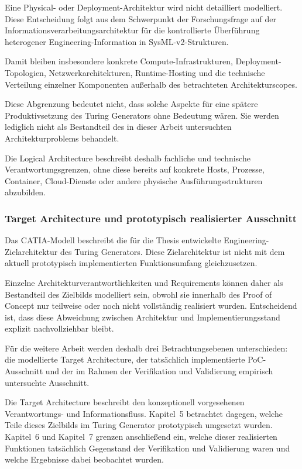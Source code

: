 Eine Physical- oder Deployment-Architektur wird nicht detailliert modelliert.
Diese Entscheidung folgt aus dem Schwerpunkt der Forschungsfrage auf der
Informationsverarbeitungsarchitektur für die kontrollierte Überführung
heterogener Engineering-Information in SysML-v2-Strukturen.

Damit bleiben insbesondere konkrete Compute-Infrastrukturen,
Deployment-Topologien, Netzwerkarchitekturen, Runtime-Hosting und die
technische Verteilung einzelner Komponenten außerhalb des betrachteten
Architekturscopes.

Diese Abgrenzung bedeutet nicht, dass solche Aspekte für eine spätere
Produktivsetzung des Turing Generators ohne Bedeutung wären. Sie werden
lediglich nicht als Bestandteil des in dieser Arbeit untersuchten
Architekturproblems behandelt.

Die Logical Architecture beschreibt deshalb fachliche und technische
Verantwortungsgrenzen, ohne diese bereits auf konkrete Hosts, Prozesse,
Container, Cloud-Dienste oder andere physische Ausführungsstrukturen
abzubilden.


\subsubsection{Target Architecture und prototypisch realisierter Ausschnitt}
\label{sec:target_vs_mvp}

Das CATIA-Modell beschreibt die für die Thesis entwickelte
Engineering-Zielarchitektur des Turing Generators. Diese Zielarchitektur ist
nicht mit dem aktuell prototypisch implementierten Funktionsumfang
gleichzusetzen.

Einzelne Architekturverantwortlichkeiten und Requirements können daher als
Bestandteil des Zielbilds modelliert sein, obwohl sie innerhalb des
Proof of Concept nur teilweise oder noch nicht vollständig realisiert wurden.
Entscheidend ist, dass diese Abweichung zwischen Architektur und
Implementierungsstand explizit nachvollziehbar bleibt.

Für die weitere Arbeit werden deshalb drei Betrachtungsebenen unterschieden:
die modellierte Target Architecture, der tatsächlich implementierte
PoC-Ausschnitt und der im Rahmen der Verifikation und Validierung empirisch
untersuchte Ausschnitt.

Die Target Architecture beschreibt den konzeptionell vorgesehenen
Verantwortungs- und Informationsfluss. Kapitel~5 betrachtet dagegen, welche
Teile dieses Zielbilds im Turing Generator prototypisch umgesetzt wurden.
Kapitel~6 und Kapitel~7 grenzen anschließend ein, welche dieser realisierten
Funktionen tatsächlich Gegenstand der Verifikation und Validierung waren und
welche Ergebnisse dabei beobachtet wurden.

